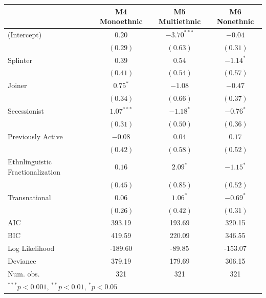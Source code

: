 \documentclass[12pt,]{book}
\let\origtable\table
\let\endorigtable\endtable
\renewenvironment{table}[1][2] {
    \singlespacing
    \expandafter\origtable\expandafter[H]
} {
    \endorigtable
}
\theoremstyle{definition}
\theoremstyle{definition}
\theoremstyle{definition}
\theoremstyle{remark}
\begin{document}
\begin{table}
\begin{center}
\begin{tabular}{l c c c }
\hline
 & M4 Monoethnic & M5 Multiethnic & M6 Nonethnic \\
\hline
(Intercept)                      & $0.20$       & $-3.70^{***}$ & $-0.04$     \\
                                 & $(0.29)$     & $(0.63)$      & $(0.31)$    \\
Splinter                         & $0.39$       & $0.54$        & $-1.14^{*}$ \\
                                 & $(0.41)$     & $(0.54)$      & $(0.57)$    \\
Joiner                           & $0.75^{*}$   & $-1.08$       & $-0.47$     \\
                                 & $(0.34)$     & $(0.66)$      & $(0.37)$    \\
Secessionist                     & $1.07^{***}$ & $-1.18^{*}$   & $-0.76^{*}$ \\
                                 & $(0.31)$     & $(0.50)$      & $(0.36)$    \\
Previously Active                & $-0.08$      & $0.04$        & $0.17$      \\
                                 & $(0.42)$     & $(0.58)$      & $(0.52)$    \\
Ethnlinguistic Fractionalization & $0.16$       & $2.09^{*}$    & $-1.15^{*}$ \\
                                 & $(0.45)$     & $(0.85)$      & $(0.52)$    \\
Transnational                    & $0.06$       & $1.06^{*}$    & $-0.69^{*}$ \\
                                 & $(0.26)$     & $(0.42)$      & $(0.31)$    \\
\hline
AIC                              & 393.19       & 193.69        & 320.15      \\
BIC                              & 419.59       & 220.09        & 346.55      \\
Log Likelihood                   & -189.60      & -89.85        & -153.07     \\
Deviance                         & 379.19       & 179.69        & 306.15      \\
Num. obs.                        & 321          & 321           & 321         \\
\hline
\multicolumn{4}{l}{\scriptsize{$^{***}p<0.001$, $^{**}p<0.01$, $^*p<0.05$}}
\end{tabular}
\caption{Logit Models of Rebel Group Ethnic Composition}
\label{tab:splintcomp}
\end{center}
\end{table}
\end{document}
